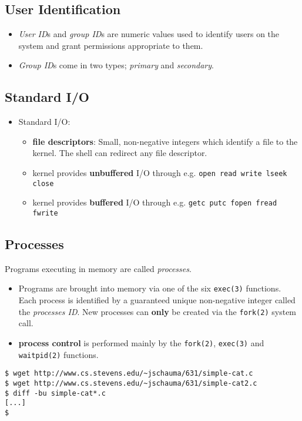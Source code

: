\documentclass[xga]{xdvislides}
\begin{document}
\subsection{User Identification}
\begin{itemize}
	\item {\em User ID}s and {\em group ID}s are numeric values used to
		identify users on the system and grant permissions appropriate to them.
	\item {\em Group ID}s come in two types; {\em primary} and {\em secondary}.
\end{itemize}

\subsection{Standard I/O}
\begin{itemize}
	\item	Standard I/O:
		\begin{itemize}
			\item {\bf file descriptors}: Small, non-negative
				integers which identify a file to the kernel.
				The shell can redirect any file descriptor.
			\item kernel provides {\bf unbuffered} I/O through e.g.
				{\tt open read write lseek close}
			\item kernel provides {\bf buffered} I/O through e.g.
				{\tt getc putc fopen fread fwrite}
		\end{itemize}
\end{itemize}

\subsection{Processes}
Programs executing in memory are called {\em processes}.
\begin{itemize}
	\item Programs are brought into memory via one of the
		six {\tt exec(3)} functions.  Each process is identified
		by a guaranteed unique non-negative integer called the
		{\em processes ID}. New processes can {\bf only} be
		created via the {\tt fork(2)} system call.
	\item {\bf process control} is performed mainly by the
		{\tt fork(2)}, {\tt exec(3)} and {\tt waitpid(2)} functions.
\end{itemize}
\vspace*{\fill}
\begin{verbatim}
$ wget http://www.cs.stevens.edu/~jschauma/631/simple-cat.c
$ wget http://www.cs.stevens.edu/~jschauma/631/simple-cat2.c
$ diff -bu simple-cat*.c
[...]
$
\end{verbatim}
\vspace*{\fill}
\end{document}
